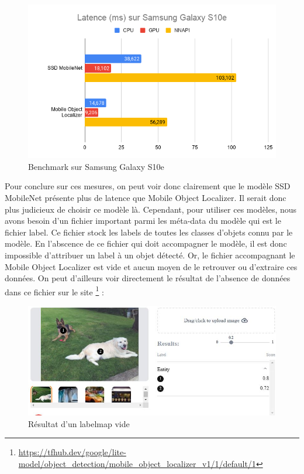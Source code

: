 \documentclass[UTF8]{EPURapport}
\begin{document}
\begin{figure}[h!]
\centering
  \includegraphics[width=\textwidth]{images/bench_s10e.png}
  \caption{Benchmark sur Samsung Galaxy S10e}
  \label{fig:benchs10e}
\end{figure}

Pour conclure sur ces mesures, on peut voir donc clairement que le modèle SSD MobileNet présente plus de latence que Mobile Object Localizer. Il serait donc plus judicieux de choisir ce modèle là. Cependant, pour utiliser ces modèles, nous avons besoin d'un fichier important parmi les méta-data du modèle qui est le fichier label. Ce fichier stock les labels de toutes les classes d'objets connu par le modèle. En l'abscence de ce fichier qui doit accompagner le modèle, il est donc impossible d'attribuer un label à un objet détecté. Or, le fichier accompagnant le Mobile Object Localizer est vide et aucun moyen de le retrouver ou d'extraire ces données.  On peut d'ailleurs voir directement le résultat de l'absence de données dans ce fichier sur le site \footnote{\url{https://tfhub.dev/google/lite-model/object_detection/mobile_object_localizer_v1/1/default/1}} :

\begin{figure}[h!]
\centering
  \includegraphics[width=.6\textwidth]{images/labels_empty.JPG}
  \caption{Résultat d'un labelmap vide}
  \label{fig:labelsempty}
\end{figure}
\end{document}
